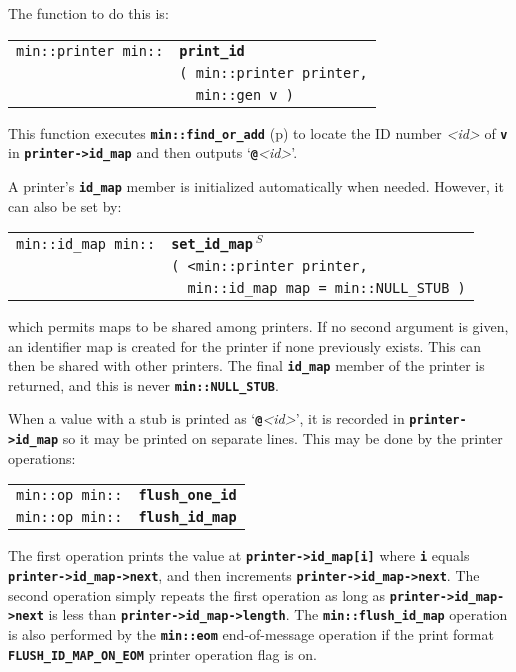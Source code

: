 \documentclass[12pt]{article}
\makeatletter
\newcommand{\TT}[1]{{\tt \bfseries #1}}
\newcommand{\ttindex}[1]{\index{#1@{\tt #1}}}
\newcommand{\pagref}[1]{p\pageref{#1}}
\newcommand{\EOL}{\penalty \exhyphenpenalty}
\newenvironment{indpar}[1][0.3in]%
	{\begin{list}{}%
		     {\setlength{\itemsep}{0in}%
		      \setlength{\topsep}{0in}%
		      \setlength{\parsep}{1ex}%
		      \setlength{\labelwidth}{#1}%
		      \setlength{\leftmargin}{#1}%
		      \addtolength{\leftmargin}{\labelsep}}%
	 \item}%
	{\end{list}}
\newcommand{\LABEL}[1]{\label{#1}}
\newlength{\ARGBREAKLENGTH}
\newcommand{\ARGBREAK}[1][\ARGBREAKLENGTH]{\\&\hspace*{#1}}
\newcommand{\MINKEY}[1]%
	   {\TT{#1}\ttindex{min::#1}\ttindex{#1}}
\newcommand{\RESIZE}{$\,^S$}
\makeatother
\begin{document}
The function to do this is:

\begin{indpar}[1em]\begin{tabular}{r@{}l}
\verb|min::printer min::| & \MINKEY{print\_id}\ARGBREAK
    \verb|( min::printer printer,|\ARGBREAK
    \verb|  min::gen v )|
\LABEL{MIN::PRINT_ID} \\
\end{tabular}\end{indpar}

This function executes
\TT{min::find\_or\_add} (\pagref{MIN::FIND_OR_ADD_OF_ID_MAP})
to locate the ID number {\em <id>} of
\TT{v} in \TT{printer->\EOL id\_\EOL map} and then outputs
`\TT{@}{\em <id>}'.

A printer's \TT{id\_map} member is initialized automatically when
needed.  However, it can also be set by:

\begin{indpar}[1em]\begin{tabular}{r@{}l}
\verb|min::id_map min::|
    & \MINKEY{set\_\EOL id\_\EOL map\RESIZE}\ARGBREAK
    \verb|( <min::printer printer,|\ARGBREAK
    \verb|  min::id_map map = min::NULL_STUB )|
\LABEL{MIN::SET_ID_MAP_OF_PRINTER} \\
\end{tabular}\end{indpar}

which permits maps to be shared among printers.  If no second argument
is given, an identifier map is created for the printer if none previously
exists.  This can then be shared with other printers.  The final
\TT{id\_\EOL map} member of the printer is returned, and this
is never \TT{min::\EOL NULL\_\EOL STUB}.

When a value with a stub is printed as
`\TT{@}{\em <id>}', it is recorded in \TT{printer->\EOL id\_\EOL map}
so it may be printed on separate lines.  This may be done by
the printer operations:

\begin{indpar}[1em]\begin{tabular}{r@{}l}
\verb|min::op min::| & \MINKEY{flush\_\EOL one\_\EOL id}
\LABEL{MIN::FLUSH_ONE_ID} \\
\verb|min::op min::| & \MINKEY{flush\_\EOL id\_\EOL map}
\LABEL{MIN::FLUSH_ID_MAP} \\
\end{tabular}\end{indpar}

The first operation prints the value at \TT{printer->\EOL id\_\EOL map[i]}
where \TT{i} equals \TT{printer->\EOL id\_\EOL map->\EOL next}, and then
increments \TT{printer->\EOL id\_\EOL map->\EOL next}.  The second operation
simply repeats the first operation as long as
\TT{printer->\EOL id\_\EOL map->\EOL next}
is less than \TT{printer->\EOL id\_\EOL map->\EOL length}.
The \TT{min::\EOL flush\_\EOL id\_\EOL map} operation is also
performed by the \TT{min::\EOL eom} end-of-message operation
if the print format
\TT{FLUSH\_\EOL ID\_\EOL MAP\_\EOL ON\_\EOL EOM} printer operation flag is on.
\end{document}
